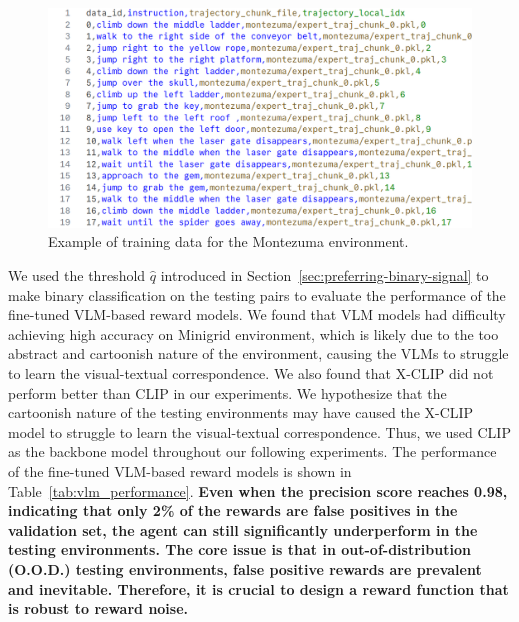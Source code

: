 \documentclass{article}
\theoremstyle{plain}
\theoremstyle{definition}
\theoremstyle{remark}
\begin{document}
\begin{figure}[H]
    \centering
    \includegraphics[width=\columnwidth]{appendix_figures/training_data_example.png}
    \caption{Example of training data for the Montezuma environment.}
\end{figure}

We used the threshold $\hat q$ introduced in Section~\ref{sec:preferring-binary-signal} to make binary classification on the testing pairs to evaluate the performance of the fine-tuned VLM-based reward models. We found that VLM models had difficulty achieving high accuracy on Minigrid environment, which is likely due to the too abstract and cartoonish nature of the environment, causing the VLMs to struggle to learn the visual-textual correspondence. We also found that X-CLIP did not perform better than CLIP in our experiments. We hypothesize that the cartoonish nature of the testing environments may have caused the X-CLIP model to struggle to learn the visual-textual correspondence. Thus, we used CLIP as the backbone model throughout our following experiments. The performance of the fine-tuned VLM-based reward models is shown in Table~\ref{tab:vlm_performance}. \textbf{Even when the precision score reaches 0.98, indicating that only 2\% of the rewards are false positives in the validation set, the agent can still significantly underperform in the testing environments. The core issue is that in out-of-distribution (O.O.D.) testing environments, false positive rewards are prevalent and inevitable. Therefore, it is crucial to design a reward function that is robust to reward noise.}
\end{document}
